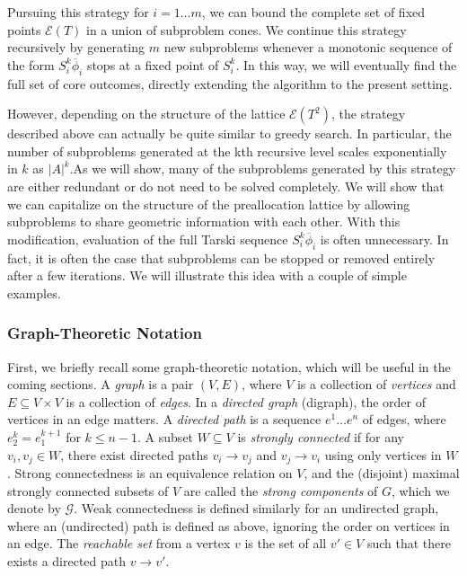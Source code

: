 \documentclass[11pt,reqno]{amsart}
\theoremstyle{definition}
\numberwithin{equation}{section}
\newcommand{\ol}{\overline}
\newcommand{\pre}{\phi}
\newcommand{\sub}{\subseteq}
\newcommand{\fix}{\mathcal{E}}
\newcommand{\toppre}{\ol{\pre}}
\newcommand{\strongc}{\mathcal{G}}
\begin{document}
Pursuing this strategy for $i = 1 \hdots m$, we can bound the complete set of fixed points $\fix(T)$ in a union of subproblem cones. 
We continue this strategy recursively by generating $m$ new subproblems whenever a monotonic sequence of the form $S_i^k \toppre_i $ stops at a fixed point of $S_i^k$. 
In this way, we will eventually find the full set of core outcomes, directly extending the \cite{EcheniqueYenmez2013} algorithm to the present setting.  

However, depending on the structure of the lattice $\fix(T^2)$, the strategy described above can actually be quite similar to greedy search.  
In particular, the number of subproblems generated at the kth recursive level scales exponentially in $k$ as $|A|^k$.As we will show, many of the subproblems generated by this strategy are either redundant or do not need to be solved completely.
We will show that we can capitalize on the structure of the preallocation lattice by allowing subproblems to share geometric information with each other. 
With this modification, evaluation of the full Tarski sequence $S_i^k \toppre_i$ is often unnecessary. 
In fact, it is often the case that subproblems can be stopped or removed entirely after a few iterations. 
We will illustrate this idea with a couple of simple examples.  

\subsubsection{Graph-Theoretic Notation}
First, we briefly recall some graph-theoretic notation, which will be useful in the coming sections. A \emph{graph} is a pair $(V,E)$, where $V$ is a collection of \emph{vertices} and $E \sub V \times V$ is a collection of \emph{edges}.
In a \emph{directed graph} (digraph), the order of vertices in an edge matters. 
A \emph{directed path} is a sequence $e^1 \hdots e^n$ of edges, where $e_2^k = e_1^{k+1}$ for $k \leq n-1$. 
A subset $W \sub V$ is \emph{strongly connected} if for any $v_i, v_j \in W$, there exist directed paths $v_i \to v_j$ and $v_j \to v_i$ using only vertices in $W$. 
Strong connectedness is an equivalence relation on $V$, and the (disjoint) maximal strongly connected subsets of $V$ are called the \emph{strong components} of $G$, which we denote by $\strongc$. 
Weak connectedness is defined similarly for an undirected graph, where an (undirected) path is defined as above, ignoring the order on vertices in an edge. 
The \emph{reachable set} from a vertex $v$ is the set of all $v' \in V$ such that there exists a directed path $v \to v'$.  
\end{document}

